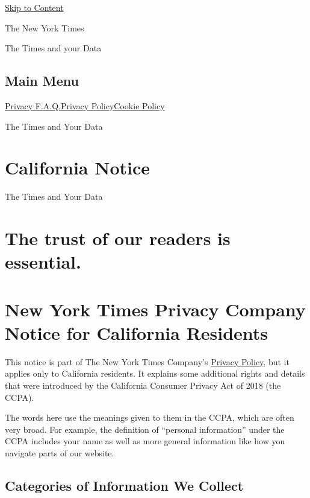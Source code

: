 \protect\hyperlink{main-content}{Skip to Content}

The New York Times

The Times and your Data

\hypertarget{main-menu}{%
\subsection{Main Menu}\label{main-menu}}

\href{/privacy}{Privacy F.A.Q.}\href{/privacy/privacy-policy}{Privacy
Policy}\href{/privacy/cookie-policy}{Cookie Policy}

The Times and Your Data

\hypertarget{california-notice}{%
\section{California Notice}\label{california-notice}}

The Times and Your Data

\hypertarget{the-trust-of-our-readers-is-essential}{%
\section{The trust of our readers is
essential.}\label{the-trust-of-our-readers-is-essential}}

\hypertarget{new-york-times-privacy-company-notice-for-california-residents}{%
\section{New York Times Privacy Company Notice for California
Residents}\label{new-york-times-privacy-company-notice-for-california-residents}}

This notice is part of The New York Times Company's
\href{/privacy/privacy-policy}{Privacy Policy}, but it applies only to
California residents. It explains some additional rights and details
that were introduced by the California Consumer Privacy Act of 2018 (the
CCPA).

The words here use the meanings given to them in the CCPA, which are
often very broad. For example, the definition of ``personal
information'' under the CCPA includes your name as well as more general
information like how you navigate parts of our website.

\hypertarget{categories-of-information-we-collect}{%
\subsection{Categories of Information We
Collect}\label{categories-of-information-we-collect}}


